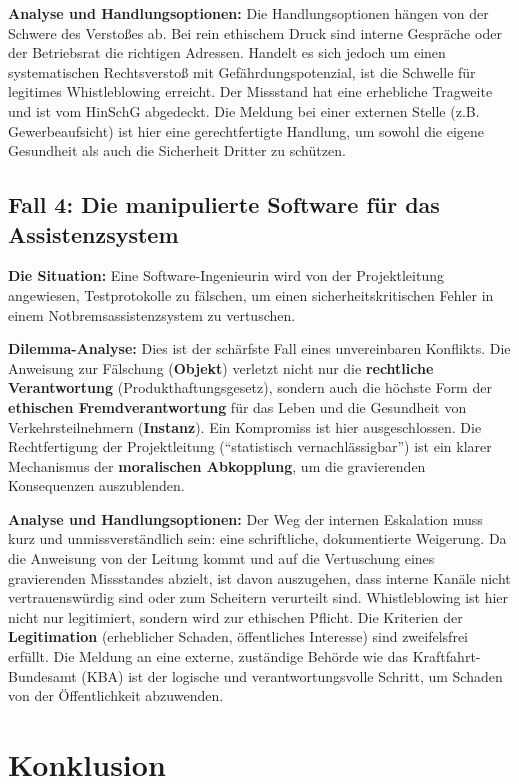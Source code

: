 \documentclass[
    12pt,               %
    a4paper,            %
    ngerman             %
]{scrartcl}
\begin{document}
\textbf{Analyse und Handlungsoptionen:}
Die Handlungsoptionen hängen von der Schwere des Verstoßes ab. Bei rein ethischem Druck sind interne Gespräche oder der Betriebsrat die richtigen Adressen. Handelt es sich jedoch um einen systematischen Rechtsverstoß mit Gefährdungspotenzial, ist die Schwelle für legitimes Whistleblowing erreicht. Der Missstand hat eine erhebliche Tragweite und ist vom HinSchG abgedeckt. Die Meldung bei einer externen Stelle (z.B. Gewerbeaufsicht) ist hier eine gerechtfertigte Handlung, um sowohl die eigene Gesundheit als auch die Sicherheit Dritter zu schützen.

\subsection{Fall 4: Die manipulierte Software für das Assistenzsystem}

\textbf{Die Situation:} Eine Software-Ingenieurin wird von der Projektleitung angewiesen, Testprotokolle zu fälschen, um einen sicherheitskritischen Fehler in einem Notbremsassistenzsystem zu vertuschen.

\textbf{Dilemma-Analyse:}
Dies ist der schärfste Fall eines unvereinbaren Konflikts. Die Anweisung zur Fälschung (\textbf{Objekt}) verletzt nicht nur die \textbf{rechtliche Verantwortung} (Produkthaftungsgesetz), sondern auch die höchste Form der \textbf{ethischen Fremdverantwortung} für das Leben und die Gesundheit von Verkehrsteilnehmern (\textbf{Instanz}). Ein Kompromiss ist hier ausgeschlossen. Die Rechtfertigung der Projektleitung (\enquote{statistisch vernachlässigbar}) ist ein klarer Mechanismus der \textbf{moralischen Abkopplung}, um die gravierenden Konsequenzen auszublenden.

\textbf{Analyse und Handlungsoptionen:}
Der Weg der internen Eskalation muss kurz und unmissverständlich sein: eine schriftliche, dokumentierte Weigerung. Da die Anweisung von der Leitung kommt und auf die Vertuschung eines gravierenden Missstandes abzielt, ist davon auszugehen, dass interne Kanäle nicht vertrauenswürdig sind oder zum Scheitern verurteilt sind. Whistleblowing ist hier nicht nur legitimiert, sondern wird zur ethischen Pflicht. Die Kriterien der \textbf{Legitimation} (erheblicher Schaden, öffentliches Interesse) sind zweifelsfrei erfüllt. Die Meldung an eine externe, zuständige Behörde wie das Kraftfahrt-Bundesamt (KBA) ist der logische und verantwortungsvolle Schritt, um Schaden von der Öffentlichkeit abzuwenden.

\section{Konklusion}
\end{document}
